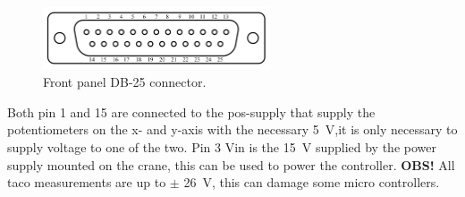 \begin{figure}[]
    \centering
    \includegraphics[width=0.6\textwidth]{pictures/DB-25 connector.pdf}
    \caption{Front panel DB-25 connector.}
    \label{fig:DB-connector}
\end{figure}

Both pin 1 and 15 are connected to the pos-supply that supply the potentiometers on the x- and y-axis with the necessary \SI{5}{V},it is only necessary to supply voltage to one of the two. Pin 3 Vin is the \SI{15}{V} supplied by the power supply mounted on the crane, this can be used to power the controller. \textbf{OBS!} All taco measurements are up to $\pm$ \SI{26}{V}, this can damage some micro controllers.

